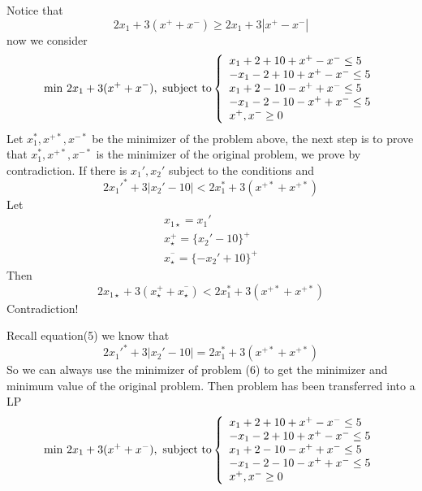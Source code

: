 \documentclass{article}
\begin{document}
Notice that 
\begin{equation}  
2x_1+3(x^++x^-) \geq 2x_1+3|x^+-x^-|
\end{equation}  
now we consider 
\begin{equation}  
\min \,2x_1+3(x^++x^-) , \textnormal{ subject to}
\left\{  
             \begin{array}{ll}
             x_1+2+10+x^+-x^-\leq 5\\
             -x_1-2+10+x^+-x^-\leq 5\\
             x_1+2-10-x^++x^-\leq 5\\
             -x_1-2-10-x^++x^-\leq 5\\
             x^+,x^-\geq 0
             \end{array}  
\right.  
\end{equation}  
Let $x_1^*,x^{+*},x^{-*}$ be the minimizer of the problem above, the next step is to prove that  $x_1^*,x^{+*},x^{-*}$ is the minimizer of the original problem, we prove by contradiction.
If there is $x_1',x_2'$ subject to the conditions and 
\begin{equation}  
2x_1'^*+3|x_2'-10| < 2x_1^*+3(x^{+*}+x^{+*})
\end{equation}  
Let 
\begin{eqnarray*}  
x_{1\star}=x_1'\\
x^{+}_\star=\{x_2'-10\}^+\\
x^{^-}_\star=\{-x_2'+10\}^+
\end{eqnarray*}  
Then 
\begin{equation}  
2x_{1\star}+3(x^{+}_\star+x^{^-}_\star) < 2x_1^*+3(x^{+*}+x^{+*})
\end{equation}  
Contradiction!

Recall equation(5) we know that
\begin{equation}  
2x_1'^*+3|x_2'-10| = 2x_1^*+3(x^{+*}+x^{+*})
\end{equation}  
So we can always use the minimizer of problem (6) to get the minimizer and minimum value of the original problem. Then problem has been transferred into a LP
\begin{equation}  
\min \,2x_1+3(x^++x^-) , \textnormal{ subject to}
\left\{  
             \begin{array}{ll}
             x_1+2+10+x^+-x^-\leq 5\\
             -x_1-2+10+x^+-x^-\leq 5\\
             x_1+2-10-x^++x^-\leq 5\\
             -x_1-2-10-x^++x^-\leq 5\\
             x^+,x^-\geq 0
             \end{array}  
\right.  
\end{equation}  
\end{document}
